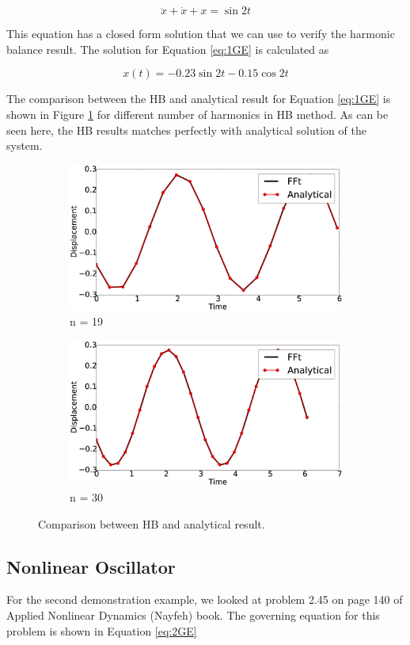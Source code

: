 \documentclass[12pt, a4paper]{extarticle}
\begin{document}
\begin{equation}\label{eq:1GE}
	\ddot{x} + \dot{x} + x = \sin 2t
\end{equation}

This equation has a closed form solution that we can use to verify the harmonic balance result. The solution for Equation \eqref{eq:1GE} is calculated as

\begin{equation}
	x(t) = -0.23 \sin 2t - 0.15 \cos 2t
\end{equation}

The comparison between the HB and analytical result for Equation \eqref{eq:1GE} is shown in Figure \ref{fig:R1} for different number of harmonics in HB method. As can be seen here, the HB results matches perfectly with analytical solution of the system.

\begin{figure}[H]
	\centering
	\begin{subfigure}[h]{8.0 cm}
		\includegraphics[width=8.0 cm]{figure/1N19.eps}
		\caption{n = 19}
	\end{subfigure}
	\begin{subfigure}[h]{8.0 cm}
        \includegraphics[width=8.0 cm]{figure/1N30.eps}
		\caption{n = 30}
    \end{subfigure}
    \caption{Comparison between HB and analytical result.}
    \label{fig:R1}
\end{figure}

\subsection{Nonlinear Oscillator}
For the second demonstration example, we looked at problem 2.45 on page 140 of Applied Nonlinear Dynamics (Nayfeh) book. The governing equation for this problem is shown in Equation \eqref{eq:2GE}
\end{document}
